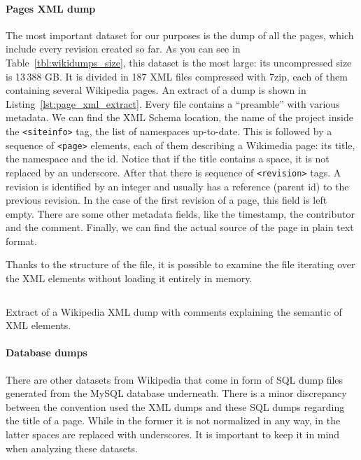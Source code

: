 \paragraph{Pages XML dump}
The most important dataset for our purposes is the dump of all the pages, which include every revision created so far.
As you can see in Table~\ref{tbl:wikidumps_size}, this dataset is the most large: its uncompressed size is 13\,388 GB\@.
It is divided in 187 XML files compressed with 7zip, each of them containing several Wikipedia pages.
An extract of a dump is shown in Listing~\ref{lst:page_xml_extract}.
Every file contains a ``preamble'' with various metadata.
We can find the XML Schema location, the name of the project inside the \texttt{<siteinfo>} tag, the list of namespaces up-to-date.
This is followed by a sequence of \texttt{<page>} elements, each of them describing a Wikimedia page: its title, the namespace and the id.
Notice that if the title contains a space, it is not replaced by an underscore.
After that there is sequence of \texttt{<revision>} tags.
A revision is identified by an integer and usually has a reference (parent id) to the previous revision.
In the case of the first revision of a page, this field is left empty.
There are some other metadata fields, like the timestamp, the contributor and the comment.
Finally, we can find the actual source of the page in plain text format.

Thanks to the structure of the file, it is possible to examine the file iterating over the XML elements without loading it entirely in memory.

\begin{listing}[t]
    \inputminted[breaklines=true]{xml}{assets/page_xml_extract.xml}
    \caption{Extract of a Wikipedia XML dump with comments explaining the semantic of XML elements.}
    \label{lst:page_xml_extract}
\end{listing}

\paragraph{Database dumps}
There are other datasets from Wikipedia that come in form of SQL dump files generated from the MySQL database underneath.
There is a minor discrepancy between the convention used the XML dumps and these SQL dumps regarding the title of a page.
While in the former it is not normalized in any way, in the latter spaces are replaced with underscores.
It is important to keep it in mind when analyzing these datasets.

